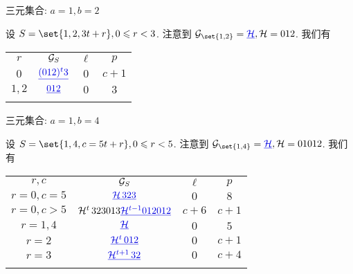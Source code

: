 \documentclass[aspectratio=169,handout]{ctexbeamer}
\renewcommand\ul[1]{{\color{main}\underline{#1}}}
\begin{document}
\begin{frame}{三元集合: $a=1,b=2$}
  \onslide<+->
  \begin{example}
    设 $S=\set{1,2,3t+r},0\le r<3$.
    注意到 $\CG_\set{1,2}=\ul\CH, \CH=012$.
    我们有
    \begin{center}
      \begin{tabular}{cccc}
        \topcolorrule
        $r$ & ${\mathcal{G}}_S$ & $\ell$ & $p$\\
        \midcolorrule
        $0$ & $\ul{(012)^t3}$ & $0$ & $c+1$\\
        $1,2$ & $\ul{012}$ & $0$ & $3$\\
        \bottomcolorrule
      \end{tabular}
    \end{center}
  \end{example}
\end{frame}


\begin{frame}{三元集合: $a=1,b=4$}
  \onslide<+->
  \begin{example}
    设 $S=\set{1,4,c=5t+r}, 0\le r<5$.
    注意到 $\CG_\set{1,4}=\ul{\CH}, \CH=01012$.
    我们有
    \begin{center}
      \begin{tabular}{cccc}
        \topcolorrule
        $r,c$ & ${\mathcal{G}}_S$ & $\ell$ & $p$\\
        \midcolorrule
        $r=0, c=5$ & $\ul{\CH\,323}$ & $0$ & $8$\\
        $r=0, c>5$ & $\CH^t\,323013\ul{\CH^{t-1}012012}$ & $c+6$ & $c+1$\\
        $r=1,4$ & $\ul\CH$ & $0$ & $5$\\
        $r=2$ & $\ul{\CH^t\,012}$ & $0$ & $c+1$\\
        $r=3$ & $\ul{\CH^{t+1}\,32}$ & $0$ & $c+4$\\
        \bottomcolorrule
      \end{tabular}
    \end{center}
  \end{example}
\end{frame}
\end{document}

